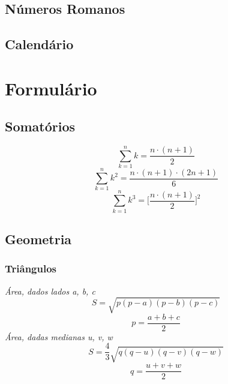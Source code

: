 \documentclass[12pt,a4paper]{article}
\begin{document}
		\subsection{Números Romanos}
			
		\subsection{Calendário}
			

	\twocolumn
	\section{Formulário}
		\subsection{Somatórios}
			\[ \sum_{k = 1}^{n} k = \frac{n \cdot (n + 1)}{2} \]
			\[ \sum_{k = 1}^{n} k^2 = \frac{n \cdot (n + 1) \cdot (2n + 1)}{6} \]
			\[ \sum_{k = 1}^{n} k^3 = \bigg[\frac{n \cdot (n + 1)}{2}\bigg]^2 \]
		\subsection{Geometria}
			\subsubsection{Triângulos}
				\emph{Área, dados lados a, b, c}
				\[ S = \sqrt{p (p - a) (p - b) (p - c)} \]
				\[ p = \frac{a + b + c}{2} \]
				\emph{Área, dadas medianas u, v, w}
				\[ S = \frac{4}{3} \sqrt{q (q - u) (q - v) (q - w)} \]
				\[ q = \frac{u + v + w}{2} \]
\end{document}
